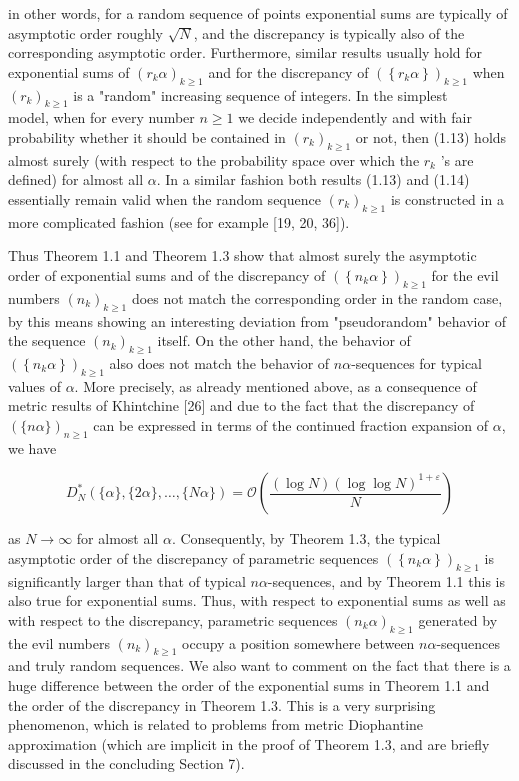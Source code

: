 \documentclass[10pt]{article}
\newcommand{\1}{\mathbf{1}}
\begin{document}
in other words, for a random sequence of points exponential sums are typically of asymptotic order roughly $\sqrt{N}$, and the discrepancy is typically also of the corresponding asymptotic order. Furthermore, similar results usually hold for exponential sums of $\left(r_{k} \alpha\right)_{k \geqslant 1}$ and for the discrepancy of $\left(\left\{r_{k} \alpha\right\}\right)_{k \geqslant 1}$ when $\left(r_{k}\right)_{k \geqslant 1}$ is a "random" increasing sequence of integers. In the simplest\\
model, when for every number $n \geqslant 1$ we decide independently and with fair probability whether it should be contained in $\left(r_{k}\right)_{k \geqslant 1}$ or not, then (1.13) holds almost surely (with respect to the probability space over which the $r_{k}$ 's are defined) for almost all $\alpha$. In a similar fashion both results (1.13) and (1.14) essentially remain valid when the random sequence $\left(r_{k}\right)_{k \geqslant 1}$ is constructed in a more complicated fashion (see for example [19, 20, 36]).

Thus Theorem 1.1 and Theorem 1.3 show that almost surely the asymptotic order of exponential sums and of the discrepancy of $\left(\left\{n_{k} \alpha\right\}\right)_{k \geqslant 1}$ for the evil numbers $\left(n_{k}\right)_{k \geqslant 1}$ does not match the corresponding order in the random case, by this means showing an interesting deviation from "pseudorandom" behavior of the sequence $\left(n_{k}\right)_{k \geqslant 1}$ itself. On the other hand, the behavior of $\left(\left\{n_{k} \alpha\right\}\right)_{k \geqslant 1}$ also does not match the behavior of $n \alpha$-sequences for typical values of $\alpha$. More precisely, as already mentioned above, as a consequence of metric results of Khintchine [26] and due to the fact that the discrepancy of $(\{n \alpha\})_{n \geqslant 1}$ can be expressed in terms of the continued fraction expansion of $\alpha$, we have


\begin{equation*}
D_{N}^{*}(\{\alpha\},\{2 \alpha\}, \ldots,\{N \alpha\})=\mathcal{O}\left(\frac{(\log N)(\log \log N)^{1+\varepsilon}}{N}\right) \tag{1.15}
\end{equation*}


as $N \rightarrow \infty$ for almost all $\alpha$. Consequently, by Theorem 1.3, the typical asymptotic order of the discrepancy of parametric sequences $\left(\left\{n_{k} \alpha\right\}\right)_{k \geqslant 1}$ is significantly larger than that of typical $n \alpha$-sequences, and by Theorem 1.1 this is also true for exponential sums. Thus, with respect to exponential sums as well as with respect to the discrepancy, parametric sequences $\left(n_{k} \alpha\right)_{k \geqslant 1}$ generated by the evil numbers $\left(n_{k}\right)_{k \geqslant 1}$ occupy a position somewhere between $n \alpha$-sequences and truly random sequences. We also want to comment on the fact that there is a huge difference between the order of the exponential sums in Theorem 1.1 and the order of the discrepancy in Theorem 1.3. This is a very surprising phenomenon, which is related to problems from metric Diophantine approximation (which are implicit in the proof of Theorem 1.3, and are briefly discussed in the concluding Section 7).
\end{document}
